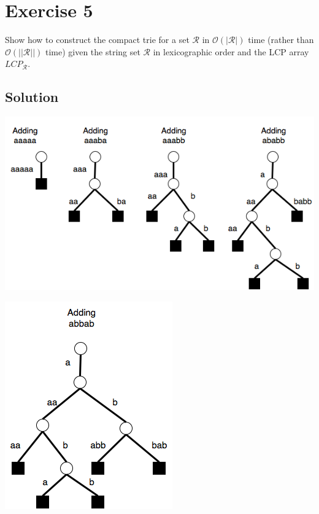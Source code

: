 \documentclass[10pt]{article}
\begin{document}
\section*{Exercise 5}
\color{blue} Show how to construct the compact trie for a set $\mathcal{R}$ in $\mathcal{O}(|\mathcal{R}|)$ time (rather than $\mathcal{O}(||\mathcal{R}||)$ time) given the string set $\mathcal{R}$ in lexicographic order and the LCP array $LCP_{\mathcal{R}}$.
\color{black}

\subsection*{Solution}

\begin{center}
\includegraphics[scale=0.6]{W2E5_1}
\end{center}

\begin{center}
\includegraphics[scale=0.6]{W2E5_2}
\end{center}
\end{document}
